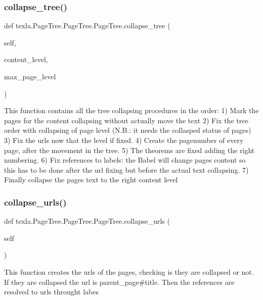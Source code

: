 \subsubsection{\texorpdfstring{collapse\+\_\+tree()}{collapse\_tree()}}
{\footnotesize\ttfamily def texla.\+Page\+Tree.\+Page\+Tree.\+Page\+Tree.\+collapse\+\_\+tree (\begin{DoxyParamCaption}\item[{}]{self,  }\item[{}]{content\+\_\+level,  }\item[{}]{max\+\_\+page\+\_\+level }\end{DoxyParamCaption})}

\begin{DoxyVerb}This function contains all the tree collapsing
procedures in the order:
1) Mark the pages for the content collapsing without
   actually move the text
2) Fix the tree order with collapsing of page level
   (N.B.: it needs the collasped status of pages)
3) Fix the urls now that the level if fixed.
4) Create the pagenumber of every page, after the
   movement in the tree.
5) The theorems are fixed adding the right numbering.
6) Fix references to labels: the Babel will change pages
   content so this has to be done after the url fixing
   but before the actual text collapsing.
7) Finally collapse the pages text to the
   right content level\end{DoxyVerb}
 \hypertarget{classtexla_1_1PageTree_1_1PageTree_1_1PageTree_a5f9436e36fa9fdd44f5e219cec82c672}{}\label{classtexla_1_1PageTree_1_1PageTree_1_1PageTree_a5f9436e36fa9fdd44f5e219cec82c672} 
\subsubsection{\texorpdfstring{collapse\+\_\+urls()}{collapse\_urls()}}
{\footnotesize\ttfamily def texla.\+Page\+Tree.\+Page\+Tree.\+Page\+Tree.\+collapse\+\_\+urls (\begin{DoxyParamCaption}\item[{}]{self }\end{DoxyParamCaption})}

\begin{DoxyVerb}This function creates the urls of the pages,
checking is they are collapsed or not. If they are collapsed
the url is parent_page#title.
Then the references are resolved to urls throught labes\end{DoxyVerb}
 \hypertarget{classtexla_1_1PageTree_1_1PageTree_1_1PageTree_a66e4934e3bf44c7901147388e2987900}{}\label{classtexla_1_1PageTree_1_1PageTree_1_1PageTree_a66e4934e3bf44c7901147388e2987900} 
